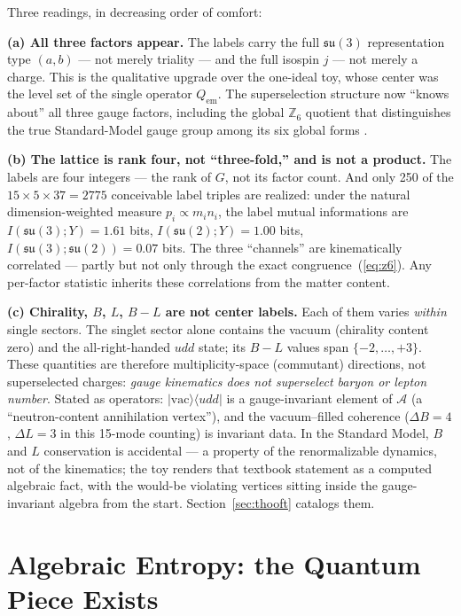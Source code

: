 \documentclass[11pt]{article}
\newcommand{\ZZ}{\mathbb{Z}}
\newcommand{\Alg}{\mathcal{A}}
\newcommand{\su}[1]{\mathfrak{su}(#1)}
\begin{document}
\medskip

Three readings, in decreasing order of comfort:

\textbf{(a) All three factors appear.} The labels carry the full $\su3$ representation type $(a,b)$ --- not merely triality --- and the full isospin $j$ --- not merely a charge. This is the qualitative upgrade over the one-ideal toy, whose center was the level set of the single operator $Q_{\mathrm{em}}$. The superselection structure now ``knows about'' all three gauge factors, including the global $\ZZ_6$ quotient that distinguishes the true Standard-Model gauge group among its six global forms \cite{tong}.

\textbf{(b) The lattice is rank four, not ``three-fold,'' and is not a product.} The labels are four integers --- the rank of $G$, not its factor count. And only 250 of the $15\times5\times37 = 2775$ conceivable label triples are realized: under the natural dimension-weighted measure $p_i \propto m_i n_i$, the label mutual informations are $I(\su3;Y) = 1.61$ bits, $I(\su2;Y) = 1.00$ bits, $I(\su3;\su2) = 0.07$ bits. The three ``channels'' are kinematically correlated --- partly but not only through the exact congruence~(\ref{eq:z6}). Any per-factor statistic inherits these correlations from the matter content.

\textbf{(c) Chirality, $B$, $L$, $B-L$ are not center labels.} Each of them varies \emph{within} single sectors. The singlet sector alone contains the vacuum (chirality content zero) and the all-right-handed $udd$ state; its $B-L$ values span $\{-2,\ldots,+3\}$. These quantities are therefore multiplicity-space (commutant) directions, not superselected charges: \emph{gauge kinematics does not superselect baryon or lepton number}. Stated as operators: $|\mathrm{vac}\rangle\langle udd|$ is a gauge-invariant element of $\Alg$ (a ``neutron-content annihilation vertex''), and the vacuum--filled coherence ($\Delta B = 4$, $\Delta L = 3$ in this 15-mode counting) is invariant data. In the Standard Model, $B$ and $L$ conservation is accidental --- a property of the renormalizable dynamics, not of the kinematics; the toy renders that textbook statement as a computed algebraic fact, with the would-be violating vertices sitting inside the gauge-invariant algebra from the start. Section~\ref{sec:thooft} catalogs them.

\section{Algebraic Entropy: the Quantum Piece Exists}\label{sec:entropy}
\end{document}

